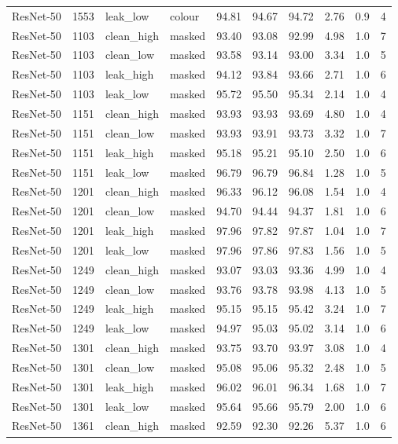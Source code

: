 {\begin{longtable}{lrllrrrrrr}
ResNet-50 & 1553 & leak\_low & colour & 94.81 & 94.67 & 94.72 & 2.76 & 0.9 & 4 \\
ResNet-50 & 1103 & clean\_high & masked & 93.40 & 93.08 & 92.99 & 4.98 & 1.0 & 7 \\
ResNet-50 & 1103 & clean\_low & masked & 93.58 & 93.14 & 93.00 & 3.34 & 1.0 & 5 \\
ResNet-50 & 1103 & leak\_high & masked & 94.12 & 93.84 & 93.66 & 2.71 & 1.0 & 6 \\
ResNet-50 & 1103 & leak\_low & masked & 95.72 & 95.50 & 95.34 & 2.14 & 1.0 & 4 \\
ResNet-50 & 1151 & clean\_high & masked & 93.93 & 93.93 & 93.69 & 4.80 & 1.0 & 4 \\
ResNet-50 & 1151 & clean\_low & masked & 93.93 & 93.91 & 93.73 & 3.32 & 1.0 & 7 \\
ResNet-50 & 1151 & leak\_high & masked & 95.18 & 95.21 & 95.10 & 2.50 & 1.0 & 6 \\
ResNet-50 & 1151 & leak\_low & masked & 96.79 & 96.79 & 96.84 & 1.28 & 1.0 & 5 \\
ResNet-50 & 1201 & clean\_high & masked & 96.33 & 96.12 & 96.08 & 1.54 & 1.0 & 4 \\
ResNet-50 & 1201 & clean\_low & masked & 94.70 & 94.44 & 94.37 & 1.81 & 1.0 & 6 \\
ResNet-50 & 1201 & leak\_high & masked & 97.96 & 97.82 & 97.87 & 1.04 & 1.0 & 7 \\
ResNet-50 & 1201 & leak\_low & masked & 97.96 & 97.86 & 97.83 & 1.56 & 1.0 & 5 \\
ResNet-50 & 1249 & clean\_high & masked & 93.07 & 93.03 & 93.36 & 4.99 & 1.0 & 4 \\
ResNet-50 & 1249 & clean\_low & masked & 93.76 & 93.78 & 93.98 & 4.13 & 1.0 & 5 \\
ResNet-50 & 1249 & leak\_high & masked & 95.15 & 95.15 & 95.42 & 3.24 & 1.0 & 7 \\
ResNet-50 & 1249 & leak\_low & masked & 94.97 & 95.03 & 95.02 & 3.14 & 1.0 & 6 \\
ResNet-50 & 1301 & clean\_high & masked & 93.75 & 93.70 & 93.97 & 3.08 & 1.0 & 4 \\
ResNet-50 & 1301 & clean\_low & masked & 95.08 & 95.06 & 95.32 & 2.48 & 1.0 & 5 \\
ResNet-50 & 1301 & leak\_high & masked & 96.02 & 96.01 & 96.34 & 1.68 & 1.0 & 7 \\
ResNet-50 & 1301 & leak\_low & masked & 95.64 & 95.66 & 95.79 & 2.00 & 1.0 & 6 \\
ResNet-50 & 1361 & clean\_high & masked & 92.59 & 92.30 & 92.26 & 5.37 & 1.0 & 6 \\

\end{longtable}}
